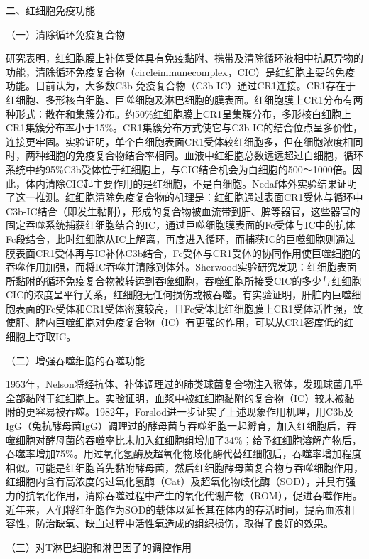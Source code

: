 \begin{center}
{\large 二、红细胞免疫功能}
\end{center}

（一）清除循环免疫复合物

研究表明，红细胞膜上补体受体具有免疫黏附、携带及清除循环液相中抗原异物的功能，清除循环免疫复合物（circleimmunecomplex，CIC）是红细胞主要的免疫功能。目前认为，大多数C3b-免疫复合物（C3b-IC）通过CR1连接。CR1存在于红细胞、多形核白细胞、巨噬细胞及淋巴细胞的膜表面。红细胞膜上CR1分布有两种形式：散在和集簇分布。约50\%红细胞膜上CR1呈集簇分布，多形核白细胞上CR1集簇分布率小于15\%。CR1集簇分布方式使它与C3b-IC的结合位点呈多价性，连接更牢固。实验证明，单个白细胞表面CR1受体较红细胞多，但在细胞浓度相同时，两种细胞的免疫复合物结合率相同。血液中红细胞总数远远超过白细胞，循环系统中约95\%C3b受体位于红细胞上，与CIC结合机会为白细胞的500～1000倍。因此，体内清除CIC起主要作用的是红细胞，不是白细胞。Nedaf体外实验结果证明了这一推测。红细胞清除免疫复合物的机理是：红细胞通过表面CR1受体与循环中C3b-IC结合（即发生黏附），形成的复合物被血流带到肝、脾等器官，这些器官的固定吞噬系统捕获红细胞结合的IC，通过巨噬细胞膜表面的Fc受体与IC中的抗体Fc段结合，此时红细胞从IC上解离，再度进入循环，而捕获IC的巨噬细胞则通过膜表面CR1受体再与IC补体C3b结合，Fc受体与CR1受体的协同作用使巨噬细胞的吞噬作用加强，而将IC吞噬并清除到体外。Sherwood实验研究发现：红细胞表面所黏附的循环免疫复合物被转运到吞噬细胞，吞噬细胞所接受CIC的多少与红细胞CIC的浓度呈平行关系，红细胞无任何损伤或被吞噬。有实验证明，肝脏内巨噬细胞表面的Fc受体和CR1受体密度较高，且Fc受体比红细胞膜上CR1受体活性强，致使肝、脾内巨噬细胞对免疫复合物（IC）有更强的作用，可以从CR1密度低的红细胞上夺取IC。

（二）增强吞噬细胞的吞噬功能

1953年，Nelson将经抗体、补体调理过的肺类球菌复合物注入猴体，发现球菌几乎全部黏附于红细胞上。实验证明，血浆中被红细胞黏附的复合物（IC）较未被黏附的更容易被吞噬。1982年，Forslod进一步证实了上述现象作用机理，用C3b及IgG（兔抗酵母菌IgG）调理过的酵母菌与吞噬细胞一起孵育，加入红细胞后，吞噬细胞对酵母菌的吞噬率比未加入红细胞组增加了34\%；给予红细胞溶解产物后，吞噬率增加75\%。用过氧化氢酶及超氧化物歧化酶代替红细胞后，吞噬率增加程度相似。可能是红细胞首先黏附酵母菌，然后红细胞酵母菌复合物与吞噬细胞作用，红细胞内含有高浓度的过氧化氢酶（Cat）及超氧化物歧化酶（SOD），并具有强力的抗氧化作用，清除吞噬过程中产生的氧化代谢产物（ROM），促进吞噬作用。近年来，人们将红细胞作为SOD的载体以延长其在体内的存活时间，提高血液相容性，防治缺氧、缺血过程中活性氧造成的组织损伤，取得了良好的效果。

（三）对T淋巴细胞和淋巴因子的调控作用

